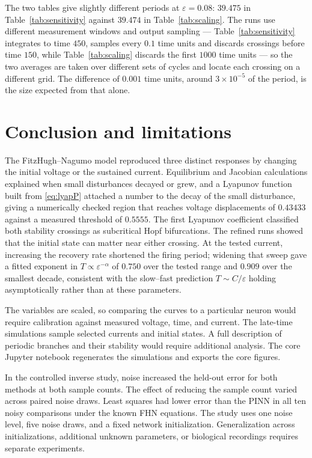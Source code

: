 \documentclass[11pt,a4paper]{article}
\begin{document}
The two tables give slightly different periods at \(\varepsilon=0.08\): \(39.475\) in Table~\ref{tab:sensitivity} against \(39.474\) in Table~\ref{tab:scaling}. The runs use different measurement windows and output sampling --- Table~\ref{tab:sensitivity} integrates to time \(450\), samples every \(0.1\) time units and discards crossings before time \(150\), while Table~\ref{tab:scaling} discards the first \(1000\) time units --- so the two averages are taken over different sets of cycles and locate each crossing on a different grid. The difference of \(0.001\) time units, around \(3\times10^{-5}\) of the period, is the size expected from that alone.




\clearpage

\section{Conclusion and limitations}

The FitzHugh--Nagumo model reproduced three distinct responses by changing the initial voltage or the sustained current. Equilibrium and Jacobian calculations explained when small disturbances decayed or grew, and a Lyapunov function built from \eqref{eq:lyapP} attached a number to the decay of the small disturbance, giving a numerically checked region that reaches voltage displacements of \(0.43433\) against a measured threshold of \(0.5555\). The first Lyapunov coefficient classified both stability crossings as subcritical Hopf bifurcations. The refined runs showed that the initial state can matter near either crossing. At the tested current, increasing the recovery rate shortened the firing period; widening that sweep gave a fitted exponent in \(T\propto\varepsilon^{-\alpha}\) of \(0.750\) over the tested range and \(0.909\) over the smallest decade, consistent with the slow--fast prediction \(T\sim C/\varepsilon\) holding asymptotically rather than at these parameters.

The variables are scaled, so comparing the curves to a particular neuron would require calibration against measured voltage, time, and current. The late-time simulations sample selected currents and initial states. A full description of periodic branches and their stability would require additional analysis. The core Jupyter notebook regenerates the simulations and exports the core figures.

In the controlled inverse study, noise increased the held-out error for both methods at both sample counts. The effect of reducing the sample count varied across paired noise draws. Least squares had lower error than the PINN in all ten noisy comparisons under the known FHN equations. The study uses one noise level, five noise draws, and a fixed network initialization. Generalization across initializations, additional unknown parameters, or biological recordings requires separate experiments.
\end{document}
